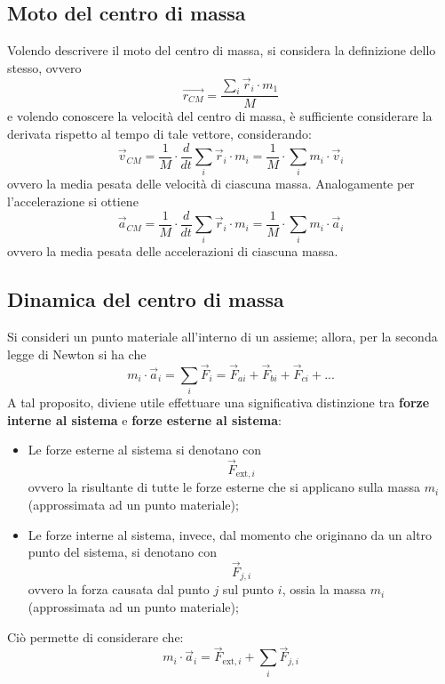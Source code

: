 \documentclass[a4paper]{extarticle}
\begin{document}
\vspace{1em}
\subsection{Moto del centro di massa}
Volendo descrivere il moto del centro di massa, si considera la definizione dello stesso, ovvero
\[\vec{r_{CM}} = \frac{\displaystyle{\sum_{i} \vec r_i \cdot m_1}}{M}\]
e volendo conoscere la velocità del centro di massa, è sufficiente considerare la derivata rispetto al tempo di tale vettore, considerando:
\[\vec v_{CM} = \frac{1}{M} \cdot \frac{d}{dt} \sum_i \vec r_i \cdot m_i = \frac{1}{M} \cdot \sum_i m_i \cdot \vec v_i\]
ovvero la media pesata delle velocità di ciascuna massa. Analogamente per l'accelerazione si ottiene
\[\vec a_{CM} = \frac{1}{M} \cdot \frac{d}{dt} \sum_i \vec r_i \cdot m_i = \frac{1}{M} \cdot \sum_i m_i \cdot \vec a_i\]
ovvero la media pesata delle accelerazioni di ciascuna massa.

\vspace{1em}
\subsection{Dinamica del centro di massa}
Si consideri un punto materiale all'interno di un assieme; allora, per la seconda legge di Newton si ha che
\[m_i \cdot \vec a_i = \sum_i \vec F_i = \vec F_{ai} + \vec F_{bi} + \vec F_{ci} + ...\]
A tal proposito, diviene utile effettuare una significativa distinzione tra \textbf{forze interne al sistema} e \textbf{forze esterne al sistema}:
\begin{itemize}
  \item Le forze esterne al sistema si denotano con
  \[\vec F_{\text{ext},i}\]
  ovvero la risultante di tutte le forze esterne che si applicano sulla massa $m_i$ (approssimata ad un punto materiale);

  \item Le forze interne al sistema, invece, dal momento che originano da un altro punto del sistema, si denotano con
  \[\vec F_{j,i}\]
  ovvero la forza causata dal punto $j$ sul punto $i$, ossia la massa $m_i$ (approssimata ad un punto materiale);
\end{itemize}
Ciò permette di considerare che:
\[\boxed{m_i \cdot \vec a_i = \vec F_{\text{ext},i} + \sum_i \vec F_{j,i}}\]
\end{document}
